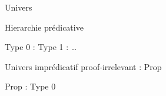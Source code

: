 \documentclass[12pt, aspectratio=169]{beamer}
\begin{document}
        \begin{frame}[fragile]{Univers}
            
            \begin{block}{Hierarchie prédicative}
        
                Type 0 : Type 1 : \dots \pause

                \begin{center}
                    \begin{prooftree}
                    \end{prooftree}
                \end{center}
                
            \end{block}

            \begin{block}{Univers imprédicatif proof-irrelevant : Prop}
                
                Prop : Type 0 \pause

                \begin{center}
                    \begin{prooftree}
                    \end{prooftree}
                \end{center}

            \end{block}

        \end{frame}
\end{document}
